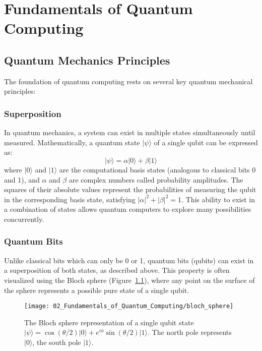 \chapter{Fundamentals of Quantum Computing}\label{chap:fundamentals}

\section{Quantum Mechanics Principles}\label{sec:quantum_principles}

The foundation of quantum computing rests on several key quantum mechanical principles:

\subsection{Superposition}\label{subsec:superposition}
In quantum mechanics, a system can exist in multiple states simultaneously until measured. Mathematically, a quantum state $|\psi\rangle$ of a single qubit can be expressed as:
\begin{equation}\label{eq:superposition}
    |\psi\rangle = \alpha|0\rangle + \beta|1\rangle
\end{equation}
where $|0\rangle$ and $|1\rangle$ are the computational basis states (analogous to classical bits 0 and 1), and $\alpha$ and $\beta$ are complex numbers called probability amplitudes. The squares of their absolute values represent the probabilities of measuring the qubit in the corresponding basis state, satisfying $|\alpha|^2 + |\beta|^2 = 1$. This ability to exist in a combination of states allows quantum computers to explore many possibilities concurrently.

\subsection{Quantum Bits}\label{subsec:qubits}
Unlike classical bits which can only be 0 or 1, quantum bits (qubits) can exist in a superposition of both states, as described above. This property is often visualized using the Bloch sphere (Figure~\ref{fig:bloch_sphere}), where any point on the surface of the sphere represents a possible pure state of a single qubit.

\begin{figure}[h]
    \centering
    \texttt{[image: 02\_Fundamentals\_of\_Quantum\_Computing/bloch\_sphere]}
    \caption{The Bloch sphere representation of a single qubit state $|\psi\rangle = \cos(\theta/2)|0\rangle + e^{i\phi}\sin(\theta/2)|1\rangle$. The north pole represents $|0\rangle$, the south pole $|1\rangle$.}
    \label{fig:bloch_sphere}
\end{figure}

